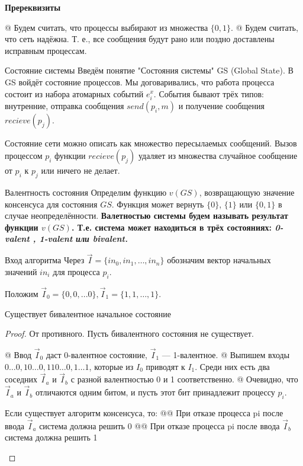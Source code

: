 \bf{Пререквизиты}
\begin{el}[ul]
@ Будем считать, что процессы выбирают из множества $\{0, 1\}$.
@ Будем считать, что сеть надёжна. Т. е., все сообщения будут рано или поздно доставлены исправным процессам.
\end{el}

\begin{flpproof}
Состояние системы
Введём понятие "Состояния системы" GS (Global State). В GS войдёт состояние процессов. 
Мы договаривались, что работа процесса состоит из набора атомарных событий $e_i^x$.
События бывают трёх типов: внутренние, отправка сообщения
$send(p_i, m)$ и получение сообщения $recieve(p_j)$.

Состояние сети можно описать как множество пересылаемых
сообщений. Вызов процессом $p_i$ функции $recieve(p_j)$ удаляет из
множества случайное сообщение от $p_i$ к $p_j$ или ничего не делает.

Валентность состояния
Определим функцию $v(GS)$, возвращающую значение консенсуса
для состояния $GS$. Функция может вернуть $\{0\}$, $\{1\}$ или $\{0, 1\}$ в случае неопределённости.
\bf{Валетностью системы} будем называть результат функции $v(GS)$.
Т.е. система может находиться в трёх состояниях: \it{0-valent} , \it{1-valent} или \it{bivalent}.

Вход алгоритма
Через $\vec{I} = \{in_0, in_1, \dots, in_n\}$ обозначим вектор начальных значений $in_i$ для процесса $p_i$.

Положим $\vec{I}_0 = \{0, 0, . . . 0\}, \vec{I}_1 = \{1, 1, \dots, 1\}$.

\begin{thm}
Существует бивалентное начальное состояние
\end{thm}
\begin{proof}
От противного. Пусть бивалентного состояния не существует.

\begin{el}[ul]
@ Ввод $\vec{I}_0$ даст 0-валентное состояние, $\vec{I}_1$ --- 1-валентное.
@ Выпишем входы $0\dots0, 10\dots0, 110\dots0, 1\dots1$, которые из $I_0$  приводят к $I_1$. Среди них есть два соседних $\vec{I}_a$ и $\vec{I}_b$ с разной валентностью 0 и 1 соответственно.
@ Очевидно, что $\vec{I}_a$ и $\vec{I}_b$ отличаются одним битом, и пусть этот бит принадлежит процессу $p_i$.

Если существует алгоритм консенсуса, то:
@@ При отказе процесса pi после ввода $\vec{I}_a$ система должна решить 0
@@ При отказе процесса pi после ввода $\vec{I}_b$ система должна решить 1
\end{el}


\end{proof}
\end{flpproof}
